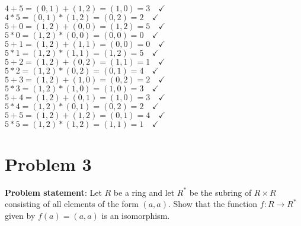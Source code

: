 \documentclass{article} %
\begin{document}
\begin{addmargin}[1em]{0em}
\begin{multicols}{2}
\\$4 + 5 = (0,1) + (1,2) = (1,0) = 3 \quad \checkmark$
\\$4 * 5 = (0,1) * (1,2) = (0,2) = 2 \quad \checkmark$
\\$5 + 0 = (1,2) + (0,0) = (1,2) = 5 \quad \checkmark$
\\$5 * 0 = (1,2) * (0,0) = (0,0) = 0 \quad \checkmark$
\\$5 + 1 = (1,2) + (1,1) = (0,0) = 0 \quad \checkmark$
\\$5 * 1 = (1,2) * (1,1) = (1,2) = 5 \quad \checkmark$
\\$5 + 2 = (1,2) + (0,2) = (1,1) = 1 \quad \checkmark$
\\$5 * 2 = (1,2) * (0,2) = (0,1) = 4 \quad \checkmark$
\\$5 + 3 = (1,2) + (1,0) = (0,2) = 2 \quad \checkmark$
\\$5 * 3 = (1,2) * (1,0) = (1,0) = 3 \quad \checkmark$
\\$5 + 4 = (1,2) + (0,1) = (1,0) = 3 \quad \checkmark$
\\$5 * 4 = (1,2) * (0,1) = (0,2) = 2 \quad \checkmark$
\\$5 + 5 = (1,2) + (1,2) = (0,1) = 4 \quad \checkmark$
\\$5 * 5 = (1,2) * (1,2) = (1,1) = 1 \quad \checkmark$
\end{multicols}
\end{addmargin}

\newpage

\section*{Problem 3}

\textbf{Problem statement}: Let $R$ be a ring and let $R^*$ be the subring of $R \times R$ consisting of all elements of the form $(a,a)$.  Show that the function $f:R \rightarrow R^*$ given by $f(a) = (a,a)$ is an isomorphism.
\\
\end{document}
